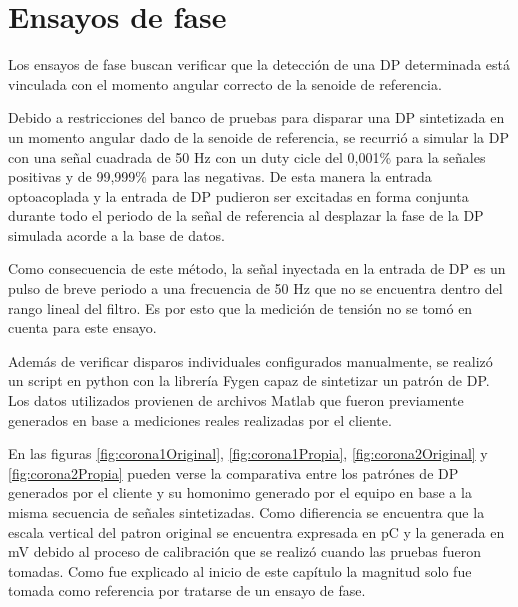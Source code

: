 \section{Ensayos de fase}

Los ensayos de fase buscan verificar que la detección de una DP determinada está vinculada con el momento angular correcto de la senoide de referencia.

Debido a restricciones del banco de pruebas para disparar una DP sintetizada en un momento angular dado de la senoide de referencia, se recurrió a simular la DP con una señal cuadrada de 50 Hz con un duty cicle del 0,001\% para la señales positivas y de 99,999\% para las negativas. De esta manera la entrada optoacoplada y la entrada de DP pudieron ser excitadas en forma conjunta durante todo el periodo de la señal de referencia al desplazar la fase de la DP simulada acorde a la base de datos.

Como consecuencia de este método, la señal inyectada en la entrada de DP es un pulso de breve periodo a una frecuencia de 50 Hz que no se encuentra dentro del rango lineal del filtro. Es por esto que la medición de tensión no se tomó en cuenta para este ensayo.

\vspace{5mm}

Además de verificar disparos individuales configurados manualmente, se realizó un script en python con la librería Fygen \citep{fygenWeb:1} capaz de sintetizar un patrón de DP. Los datos utilizados provienen de archivos Matlab que fueron previamente generados en base a mediciones reales realizadas por el cliente.

En las figuras \ref{fig:corona1Original}, \ref{fig:corona1Propia}, \ref{fig:corona2Original} y \ref{fig:corona2Propia} pueden verse la comparativa entre los patrónes de DP generados por el cliente y su homonimo generado por el equipo en base a la misma secuencia de señales sintetizadas. Como difierencia se encuentra que la escala vertical del patron original se encuentra expresada en pC y la generada en mV debido al proceso de calibración que se realizó cuando las pruebas fueron tomadas. Como fue explicado al inicio de este capítulo la magnitud solo fue tomada como referencia por tratarse de un ensayo de fase.

\vspace{10mm}

